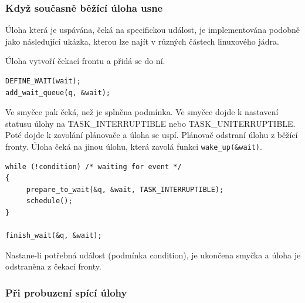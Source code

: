 \documentclass[
  master=true,
  font=sans,
  printversion=false,
  joinlists=true,
  figures=true,
  tables=true,
  sourcecodes=false,
  theorems=false,
  bibencoding=utf8,
  language=czech,
  encoding=utf8,
  field=ainfk,
  biblatex,
  glossaries,
  index
]{kidiplom}
\begin{document}
%
\subsubsection{Když současně běžící úloha usne}

Úloha která je uspávána, čeká na specifickou událost, je implementována podobně jako následující ukázka, kterou lze najít v různých částech linuxového jádra.

%
Úloha vytvoří čekací frontu a přidá se do ní. 
\nopagebreak
\begin{verbatim}
DEFINE_WAIT(wait);
add_wait_queue(q, &wait);
\end{verbatim}
Ve smyčce pak čeká, než je splněna podmínka. Ve smyčce dojde k nastavení statusu úlohy na TASK\_INTERRUPTIBLE nebo TASK\_UNITERRUPTIBLE. Poté dojde k zavolání plánovače a úloha se uspí. Plánovač odstraní úlohu z běžící fronty. Úloha čeká na jinou úlohu, která zavolá funkci \verb#wake_up(&wait)#.
 
\begin{verbatim}
while (!condition) /* waiting for event */
{ 
     prepare_to_wait(&q, &wait, TASK_INTERRUPTIBLE); 
     schedule(); 
} 

finish_wait(&q, &wait);
\end{verbatim}

Nastane-li potřebná událost (podmínka condition), je ukončena smyčka a úloha je odstraněna z čekací fronty. 

\subsubsection{Při probuzení spící úlohy}

\end{document}
